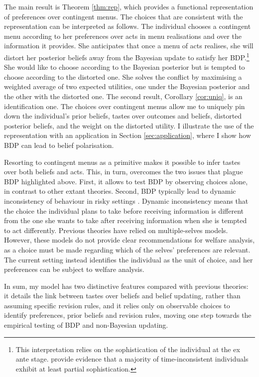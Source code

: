 The main result is Theorem \ref{thm:rep}, which provides a functional representation of preferences over contingent menus. The choices that are consistent with the representation can be interpreted as follows. The individual chooses a contingent menu according to her preferences over acts in menu realisations and over the information it provides. She anticipates that once a menu of acts realises, she will distort her posterior beliefs away from the Bayesian update to satisfy her BDP.\footnote{This interpretation relies on the sophistication of the individual at the ex ante stage. \cite{cobb-clarkPredictivePowerSelfcontrol2022} provide evidence that a majority of time-inconsistent individuals exhibit at least partial sophistication.} She would like to choose according to the Bayesian posterior but is tempted to choose according to the distorted one. She solves the conflict by maximising a weighted average of two expected utilities, one under the Bayesian posterior and the other with the distorted one. The second result, Corollary \ref{cor:uniq}, is an identification one. The choices over contingent menus allow me to uniquely pin down the individual's prior beliefs, tastes over outcomes and beliefs, distorted posterior beliefs, and the weight on the distorted utility. I illustrate the use of the representation with an application in Section \ref{sec:application}, where I show how BDP can lead to belief polarisation.

Resorting to contingent menus as a primitive makes it possible to infer tastes over both beliefs and acts. This, in turn, overcomes the two issues that plague BDP highlighted above. First, it allows to test BDP by observing choices alone, in contrast to other extant theories. Second, BDP typically lead to dynamic inconsistency of behaviour in risky settings \citep[p. 863]{battigalliBeliefdependentMotivationsPsychological2022}. Dynamic inconsistency means that the choice the individual plans to take before receiving information is different from the one she wants to take after receiving information when she is tempted to act differently. Previous theories have relied on multiple-selves models. However, these models do not provide clear recommendations for welfare analysis, as a choice must be made regarding which of the selves' preferences are relevant. The current setting instead identifies the individual as the unit of choice, and her preferences can be subject to welfare analysis.

In sum, my model has two distinctive features compared with previous theories: it details the link between tastes over beliefs and belief updating, rather than assuming specific revision rules, and it relies only on observable choices to identify preferences, prior beliefs and revision rules, moving one step towards the empirical testing of BDP and non-Bayesian updating.

